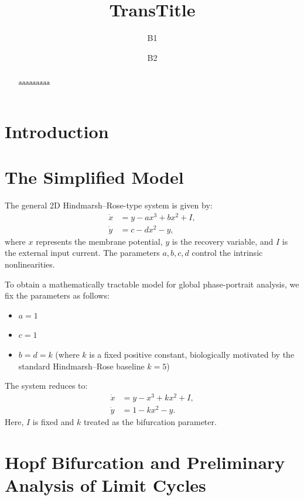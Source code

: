 \documentclass[11pt,reqno]{amsart}
\title[T]{TransTitle}
\author[A1]{B1}
\author[A2]{B2}
\theoremstyle{plain}
\theoremstyle{definition}
\theoremstyle{remark}
\begin{document}
\maketitle


\begin{abstract}
aaaaaaaaa
\end{abstract}





\section{Introduction}
\label{sec:intro}

\section{The Simplified Model}

The general 2D Hindmarsh--Rose-type system is given by:
\begin{equation}
\begin{aligned}
\dot{x} &= y - ax^3 + bx^2 + I, \\
\dot{y} &= c - dx^2 - y,
\end{aligned}
\end{equation}
where \(x\) represents the membrane potential, \(y\) is the recovery variable, and \(I\) is the external input current. The parameters \(a, b, c, d\) control the intrinsic nonlinearities.

To obtain a mathematically tractable model for global phase-portrait analysis, we fix the parameters as follows:
\begin{itemize}
    \item \(a = 1\)
    \item \(c = 1\)
    \item \(b = d = k\) (where \(k\) is a fixed positive constant, biologically motivated by the standard Hindmarsh--Rose baseline \(k=5\))
\end{itemize}

The system reduces to:
\begin{equation}
\begin{aligned}
\dot{x} &= y - x^3 + kx^2 + I, \\
\dot{y} &= 1 - kx^2 - y.
\end{aligned} \tag{S}
\label{eq:simplified}
\end{equation}
Here, \(I\) is fixed and $k$ treated as the bifurcation parameter.

\section{Hopf Bifurcation and Preliminary Analysis of Limit Cycles}
\end{document}
